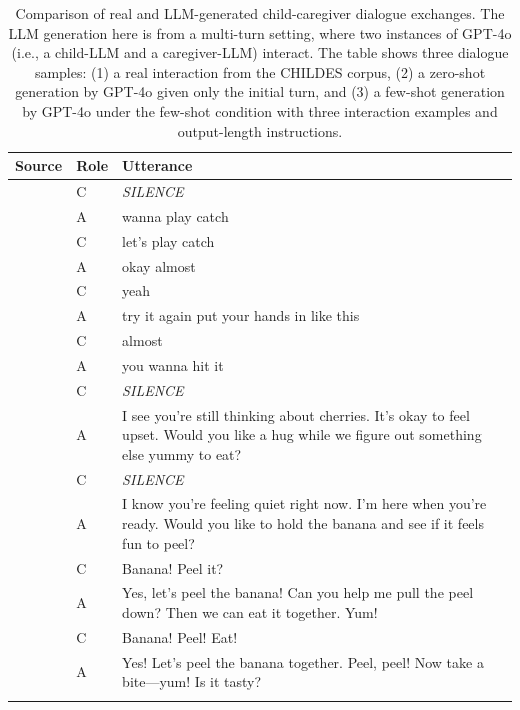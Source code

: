 \begin{table}[h]
    \small
    \centering
    \caption{Comparison of real and LLM-generated child-caregiver dialogue exchanges. The LLM generation here is from a multi-turn setting, where two instances of GPT-4o (i.e., a child-LLM and a caregiver-LLM) interact. The table shows three dialogue samples: (1) a real interaction from the CHILDES corpus, (2) a zero-shot generation by GPT-4o given only the initial turn, and (3) a few-shot generation by GPT-4o under the few-shot condition with three interaction examples and output-length instructions.}
    \label{tab:samples}
    \setlength{\tabcolsep}{4pt}
    \begin{tabularx}{\textwidth}{l l X}
    \toprule
    \textbf{Source} & \textbf{Role} & \textbf{Utterance} \\
    \midrule
    & C & \textit{SILENCE} \\
    & A & wanna play catch \\
    & C & let's play catch \\
    & A & okay almost \\
    & C & yeah \\
    & A & try it again put your hands in like this \\
    & C & almost \\
    & A & you wanna hit it \\
    \midrule
    & C & \textit{SILENCE} \\
    & A & I see you're still thinking about cherries. It's okay to feel upset. Would you like a hug while we figure out something else yummy to eat? \\
    & C & \textit{SILENCE} \\
    & A & I know you're feeling quiet right now. I'm here when you're ready. Would you like to hold the banana and see if it feels fun to peel? \\
    & C & Banana! Peel it? \\
    & A & Yes, let's peel the banana! Can you help me pull the peel down? Then we can eat it together. Yum! \\
    & C & Banana! Peel! Eat! \\
    & A & Yes! Let’s peel the banana together. Peel, peel! Now take a bite—yum! Is it tasty? \\
    \midrule

\end{tabularx}
\end{table}
